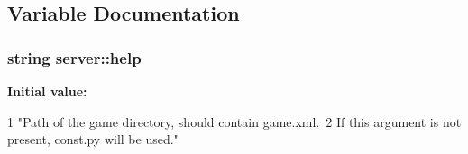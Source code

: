 \subsection{\-Variable \-Documentation}
\hypertarget{namespaceserver_af10abb2787832d4726e814bb8a7e86ff}{
\subsubsection[{help}]{\setlength{\rightskip}{0pt plus 5cm}string server\-::help}}\label{namespaceserver_af10abb2787832d4726e814bb8a7e86ff}
{\bfseries \-Initial value\-:}
\begin{DoxyCode}
1 "Path of the game directory, should contain game.xml.\
2                          If this argument is not present, const.py will be
       used."
\end{DoxyCode}
